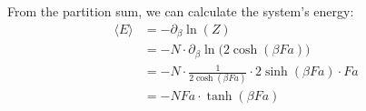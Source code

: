     \noindent
    From the partition sum, we can calculate the system's energy:
    \begin{align}
        \langle E\rangle
        &=-\partial_\beta \ln(Z) \\
        &=-N\cdot\partial_\beta\ln\bigg(2\cosh(\beta Fa)\bigg) \\
        &=-N\cdot\frac{1}{2\cosh(\beta Fa)}\cdot 2\sinh(\beta Fa)\cdot Fa \\
        &=-NFa\cdot\tanh(\beta Fa)
    \end{align}

\newpage
